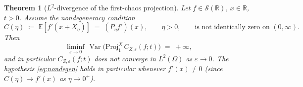 \documentclass[11pt,reqno]{amsart}
\theoremstyle{plain}
\newtheorem{theorem}{Theorem}[section]
\theoremstyle{definition}
\theoremstyle{remark}
\newcommand{\R}{\mathbb{R}}
\newcommand{\E}{\mathbb{E}}
\newcommand{\IBM}{Z}
\DeclareMathOperator{\Var}{Var}
\begin{document}
\begin{theorem}[$L^{2}$-divergence of the first-chaos projection]
\label{prop:var-divergence}
Let $f\in\mathscr S(\R)$, $x\in\R$, $t>0$. Assume the
nondegeneracy condition
\begin{equation}\label{eq:nondegen}
  C(\eta)\;\coloneqq\;\E[f'(x+X_\eta)]\;=\;(P_\eta f')(x),
  \qquad\eta>0,\qquad\text{is not identically zero on }(0,\infty).
\end{equation}
Then
\begin{equation}\label{eq:var-diverges}
  \liminf_{\varepsilon\to 0}\,
   \Var\bigl(\mathrm{Proj}_1^{X}\,C_{\IBM,\varepsilon}(f;t)\bigr)\;=\;+\infty,
\end{equation}
and in particular $C_{\IBM,\varepsilon}(f;t)$ does not converge in
$L^{2}(\Omega)$ as $\varepsilon\to 0$. The hypothesis
\eqref{eq:nondegen} holds in particular whenever $f'(x)\ne 0$
(since $C(\eta)\to f'(x)$ as $\eta\to 0^{+}$).
\end{theorem}
\end{document}
